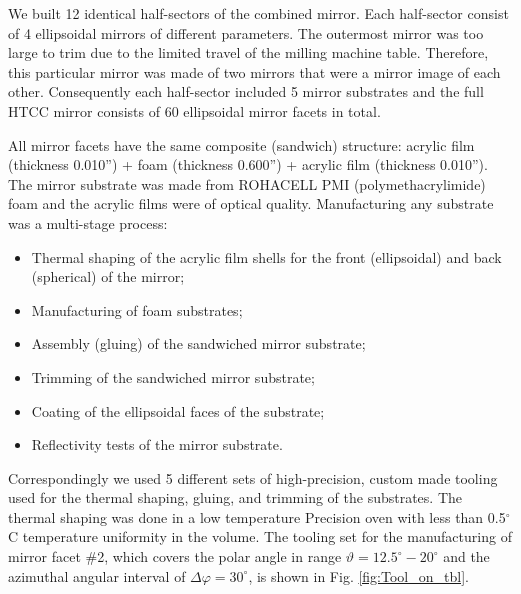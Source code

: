 We built 12 identical half-sectors of the combined mirror. Each half-sector consist of 4 ellipsoidal mirrors of different parameters. The outermost mirror was too large to trim due to the limited travel of the milling machine table. Therefore, this particular mirror was made of two mirrors that were a mirror image of each other. Consequently each half-sector included 5 mirror substrates and the full HTCC mirror consists of 60 ellipsoidal mirror facets in total. 

All mirror facets have the same composite (sandwich) structure: acrylic film (thickness 0.010”) + foam (thickness 0.600”) + acrylic film (thickness 0.010”). The mirror substrate was made from ROHACELL PMI (polymethacrylimide) foam and the acrylic films were of optical quality. Manufacturing any substrate was a multi-stage process:
\begin{itemize}
    \item Thermal shaping of the acrylic film shells for the front (ellipsoidal) and back (spherical) of the mirror;
    \item Manufacturing of foam substrates;
    \item Assembly (gluing) of the sandwiched mirror substrate;
    \item Trimming of the sandwiched mirror substrate;
    \item Coating of the ellipsoidal faces of the substrate;
    \item Reflectivity tests of the mirror substrate.
    \end{itemize}

Correspondingly we used 5 different sets of high-precision, custom made tooling used for the thermal shaping, gluing, and trimming of the substrates. The thermal shaping was done in a low temperature Precision oven with less than  0.5$^\circ$C  temperature uniformity in the volume. The tooling set for the manufacturing of mirror facet \#2, which covers the polar angle in range
$\vartheta = 12.5^\circ - 20^\circ$ and the azimuthal angular interval of $\Delta\varphi = 30^\circ$, is shown in Fig. \ref{fig:Tool_on_tbl}.

